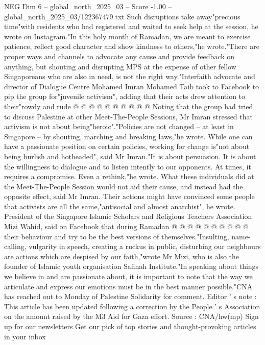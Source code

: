 \begin{textsample}{NEG Dim 6 – global\_north\_2025\_03 – Score -1.00 – global\_north\_2025\_03/122367479.txt}
Such disruptions take away"precious time"with residents who had registered and waited to seek help at the session, he wrote on Instagram."In this holy month of Ramadan, we are meant to exercise patience, reflect good character and show kindness to others,"he wrote."There are proper ways and channels to advocate any cause and provide feedback on anything, but shouting and disrupting MPS at the expense of other fellow Singaporeans who are also in need, is not the right way."Interfaith advocate and director of Dialogue Centre Mohamed Imran Mohamed Taib took to Facebook to pip the group for"juvenile activism", adding that their acts drew attention to their"rowdy and rude @ @ @ @ @ @ @ @ @ @ Noting that the group had tried to discuss Palestine at other Meet-The-People Sessions, Mr Imran stressed that activism is not about being"heroic"."Policies are not changed -- at least in Singapore -- by shouting, marching and breaking laws,"he wrote.
While one can have a passionate position on certain policies, working for change is"not about being burlish and hotheaded", said Mr Imran."It is about persuasion.
It is about the willingness to dialogue and to listen intently to our opponents.
At times, it requires a compromise.
Even a rethink,"he wrote.
What these individuals did at the Meet-The-People Session would not aid their cause, and instead had the opposite effect, said Mr Imran.
Their actions might have convinced some people that activists are all the same,"antisocial and almost anarchist", he wrote.
President of the Singapore Islamic Scholars and Religious Teachers Association Mizi Wahid, said on Facebook that during Ramadan @ @ @ @ @ @ @ @ @ @ their behaviour and try to be the best versions of themselves."Insulting, name-calling, vulgarity in speech, creating a ruckus in public, disturbing our neighbours are actions which are despised by our faith,"wrote Mr Mizi, who is also the founder of Islamic youth organisation Safinah Institute."In speaking about things we believe in and are passionate about, it is important to note that the way we articulate and express our emotions must be in the best manner possible."CNA has reached out to Monday of Palestine Solidarity for comment.
Editor ' s note : This article has been updated following a correction by the People ' s Association on the amount raised by the M3 Aid for Gaza effort.
Source : CNA/hw(mp) Sign up for our newsletters Get our pick of top stories and thought-provoking articles in your inbox

\end{textsample}
